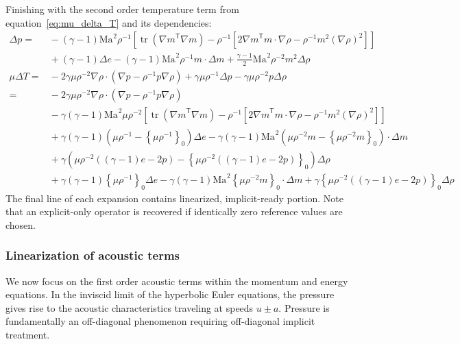 \documentclass[letterpaper,11pt,nointlimits,reqno,draft]{amsart}
\newcommand{\trans}[1]{{#1}^{\ensuremath{\mathsf{T}}}}
\newcommand{\Mach}[1][]{\ensuremath{\mbox{Ma}_{#1}}}
\newcommand{\reference}[1]{\ensuremath{\left\{#1\right\}_{0}}}
\newcommand{\lessreference}[1]
  {\ensuremath{\left({#1}-\reference{#1}\right)}}
\DeclareMathOperator{\trace}{tr}
\begin{document}
Finishing with the second order temperature term from
equation~\eqref{eq:mu_delta_T} and its dependencies:
\begin{align}
\Delta{}p =
  &{}- \left(\gamma-1\right)\Mach^{2}\rho^{-1}\left[
             \trace\left(\trans{\nabla{}m}\nabla{}m\right)
           - \rho^{-1}\left[
               2\trans{\nabla{}m}m\cdot\nabla{}\rho
             - \rho^{-1} m^2 \left(\nabla\rho\right)^{2}
           \right]
       \right]
\\
  &{}+ \left(\gamma-1\right)\Delta{}e
     - \left(\gamma-1\right)\Mach^{2}\rho^{-1}m\cdot\Delta{}m
     + \frac{\gamma-1}{2}\Mach^{2}\rho^{-2}m^2 \Delta\rho
\\
\label{eq:linear_ready_delta_T}
\mu\Delta{}T =
  &{}- 2\gamma\mu\rho^{-2}\nabla\rho\cdot
       \left(\nabla{}p-\rho^{-1}p\nabla\rho\right)
     + \gamma\mu\rho^{-1}\Delta{}p
     - \gamma\mu\rho^{-2}p\Delta\rho
\\
=
  &{}- 2\gamma\mu\rho^{-2}\nabla{}\rho\cdot
       \left(\nabla{}p-\rho^{-1}p\nabla\rho\right)
\\
  &{}- \gamma\left(\gamma-1\right)\Mach^{2}\mu\rho^{-2}\left[
             \trace\left(\trans{\nabla{}m}\nabla{}m\right)
           - \rho^{-1}\left[
               2\trans{\nabla{}m}m\cdot\nabla{}\rho
             - \rho^{-1} m^2 \left(\nabla\rho\right)^{2}
           \right]
       \right]
\\
  &{}+ \gamma\left(\gamma-1\right)\lessreference{\mu\rho^{-1}}\Delta{}e
     - \gamma\left(\gamma-1\right)\Mach^{2}
       \lessreference{\mu\rho^{-2}m}\cdot\Delta{}m
\\
  &{}+ \gamma\lessreference{
           \mu\rho^{-2}\left(\left(\gamma-1\right)e-2p\right)
       } \Delta\rho
\\
  &{}+ \gamma\left(\gamma-1\right)\reference{\mu\rho^{-1}}\Delta{}e
     - \gamma\left(\gamma-1\right)\Mach^{2}
       \reference{\mu\rho^{-2}m}\cdot\Delta{}m
     + \gamma\reference{
           \mu\rho^{-2}\left(\left(\gamma-1\right)e-2p\right)
       } \Delta\rho
\end{align}
The final line of each expansion contains linearized, implicit-ready portion.
Note that an explicit-only operator is recovered if identically zero reference
values are chosen.

\subsubsection{Linearization of acoustic terms}

We now focus on the first order acoustic terms within the momentum and energy
equations.  In the inviscid limit of the hyperbolic Euler equations, the
pressure gives rise to the acoustic characteristics traveling at speeds
$u\pm{}a$.  Pressure is fundamentally an off-diagonal phenomenon requiring
off-diagonal implicit treatment.
\end{document}
